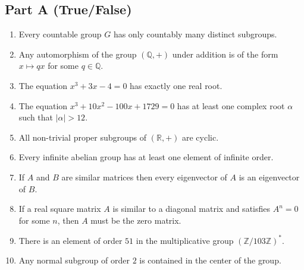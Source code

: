 \documentclass[11pt, a4paper]{article}
\begin{document}
\subsection*{Part A (True/False)}
\begin{enumerate}
  \item Every countable group $G$ has only countably many distinct subgroups.
  \item Any automorphism of the group $(\mathbb{Q}, +)$ under addition is of the form $x \mapsto qx$ for some $q \in \mathbb{Q}$.
  \item The equation $x^3 + 3x - 4 = 0$ has exactly one real root.
  \item The equation $x^3 + 10x^2 - 100x + 1729 = 0$ has at least one complex root $\alpha$ such that $|\alpha| > 12$.
  \item All non-trivial proper subgroups of $(\mathbb{R}, +)$ are cyclic.
  \item Every infinite abelian group has at least one element of infinite order.
  \item If $A$ and $B$ are similar matrices then every eigenvector of $A$ is an eigenvector of $B$.
  \item If a real square matrix $A$ is similar to a diagonal matrix and satisfies $A^n = 0$ for some $n$, then $A$ must be the zero matrix.
  \item There is an element of order $51$ in the multiplicative group $(\mathbb{Z}/103\mathbb{Z})^*$.
  \item Any normal subgroup of order $2$ is contained in the center of the group.
\end{enumerate}
\end{document}
